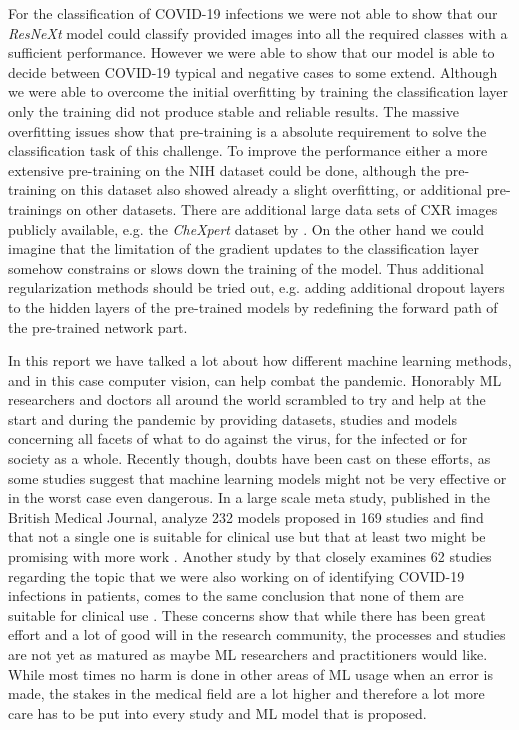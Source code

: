 For the classification of COVID-19 infections we were not able to show that our \textit{ResNeXt} model could classify provided images into all the required classes with a sufficient performance. However we were able to show that our model is able to decide between COVID-19 typical and negative cases to some extend. Although we were able to overcome the initial overfitting by training the classification layer only the training did not produce stable and reliable results. The massive overfitting issues show that pre-training is a absolute requirement to solve the classification task of this challenge. To improve the performance either a more extensive pre-training on the NIH dataset could be done, although the pre-training on this dataset also showed already a slight overfitting, or additional pre-trainings on other datasets. There are additional large data sets of \ac{CXR} images publicly available, e.g. the \textit{CheXpert} dataset by \citeauthor{irvin2019chexpert} \autocite{irvin2019chexpert}. On the other hand we could imagine that the limitation of the gradient updates to the classification layer somehow constrains or slows down the training of the model. Thus additional regularization methods should be tried out, e.g. adding additional dropout layers to the hidden layers of the pre-trained models by redefining the forward path of the pre-trained network part.

In this report we have talked a lot about how different machine learning methods, and in this case computer vision, can help combat the pandemic. Honorably ML researchers and doctors all around the world scrambled to try and help at the start and during the pandemic by providing datasets, studies and models concerning all facets of what to do against the virus, for the infected or for society as a whole. Recently though, doubts have been cast on these efforts, as some studies suggest that machine learning models might not be very effective or in the worst case even dangerous. In a large scale meta study, published in the British Medical Journal, \citeauthor{wynants_prediction_2020} analyze 232 models proposed in 169 studies and find that not a single one is suitable for clinical use but that at least two might be promising with more work \autocite{wynants_prediction_2020}. Another study by \citeauthor{aix-covnet_common_2021} that closely examines 62 studies regarding the topic that we were also working on of identifying COVID-19 infections in patients, comes to the same conclusion that none of them are suitable for clinical use \autocite{aix-covnet_common_2021}. These concerns show that while there has been great effort and a lot of good will in the research community, the processes and studies are not yet as matured as maybe ML researchers and practitioners would like. While most times no harm is done in other areas of ML usage when an error is made, the stakes in the medical field are a lot higher and therefore a lot more care has to be put into every study and ML model that is proposed.

